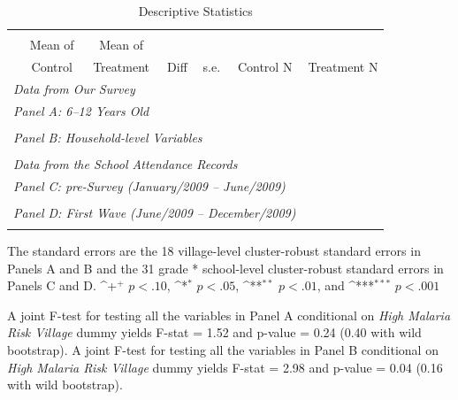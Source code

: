 \documentclass[fleqn,11pt]{article}
\newcommand{\sym}[1]{\rlap{$#1$}}
\def\sym#1{\ifmmode^{#1}\else\(^{#1}\)\fi
}
\begin{document}
\begin{table}[h]
\caption{Descriptive Statistics}

\begin{adjustbox}{max width=\textwidth}
\begin{threeparttable}
\label{descriptive_merge_child}\centering
\begin{tabular}{l*{1}{cccccc}}
\hline\hline\\
		&Mean of& Mean of&&&&\\
	&   Control&    Treatment&        Diff&        s.e.& Control N&  Treatment N\\
              \multicolumn{6}{l}{\it Data from Our Survey}        \\ \hline
              \multicolumn{6}{l}{\it Panel A:  6--12 Years Old}        \\

\hline 
 \\
\multicolumn{6}{l}{{\it Panel B: Household-level Variables}} \\
\hline  \\
              \multicolumn{6}{l}{\it Data from the School Attendance Records}        \\ 
\hline
              \multicolumn{6}{l}{\it Panel C: pre-Survey (January/2009 -- June/2009)}   \\
              \hline
               \\
              \multicolumn{6}{l}{\it Panel D: First Wave (June/2009 -- December/2009)}   \\
              \hline
               \\ \hline \hline
\end{tabular}
\begin{tablenotes}
\item The standard errors are the 18 village-level cluster-robust standard errors in Panels A and B and the 31 grade * school-level cluster-robust standard errors in Panels C and D.  \sym{+} \(p<.10\), \sym{*} \(p<.05\), \sym{**} \(p<.01\), and \sym{***} \(p<.001\)
\item A joint F-test for testing all the variables in Panel A conditional on \textit{High Malaria Risk Village} dummy yields F-stat = 1.52 and p-value = 0.24 (0.40 with wild bootstrap). A joint F-test for testing all the variables in Panel B conditional on \textit{High Malaria Risk Village} dummy yields F-stat = 2.98 and p-value = 0.04 (0.16 with wild bootstrap).  
\end{tablenotes}
\end{threeparttable}
\end{adjustbox}
\end{table}
\end{document}
